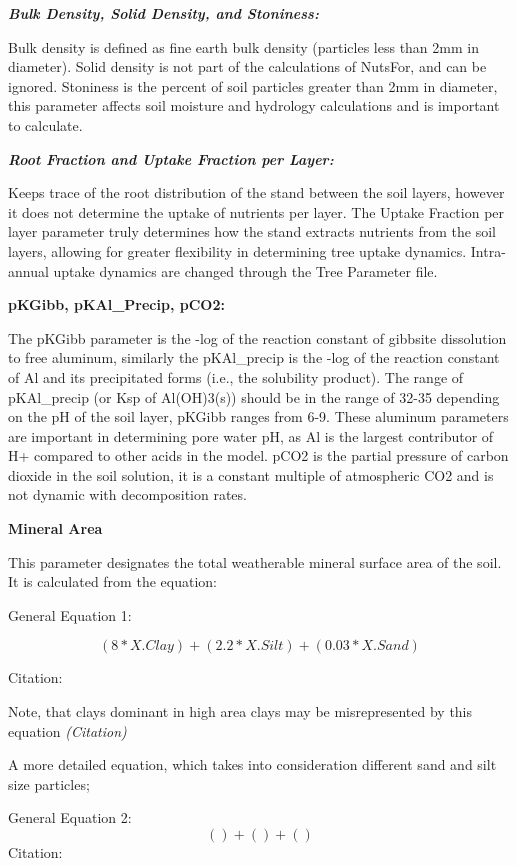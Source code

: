 \documentclass[
]{article}
\begin{document}
\textbf{\emph{Bulk Density, Solid Density, and Stoniness:}}

Bulk density is defined as fine earth bulk density (particles less than
2mm in diameter). Solid density is not part of the calculations of
NutsFor, and can be ignored. Stoniness is the percent of soil particles
greater than 2mm in diameter, this parameter affects soil moisture and
hydrology calculations and is important to calculate.

\textbf{\emph{Root Fraction and Uptake Fraction per Layer:}}

Keeps trace of the root distribution of the stand between the soil
layers, however it does not determine the uptake of nutrients per layer.
The Uptake Fraction per layer parameter truly determines how the stand
extracts nutrients from the soil layers, allowing for greater
flexibility in determining tree uptake dynamics. Intra-annual uptake
dynamics are changed through the Tree Parameter file.

\textbf{pKGibb, pKAl\_Precip, pCO2:}

The pKGibb parameter is the -log of the reaction constant of gibbsite
dissolution to free aluminum, similarly the pKAl\_precip is the -log of
the reaction constant of Al and its precipitated forms (i.e., the
solubility product). The range of pKAl\_precip (or Ksp of Al(OH)3(s))
should be in the range of 32-35 depending on the pH of the soil layer,
pKGibb ranges from 6-9. These aluminum parameters are important in
determining pore water pH, as Al is the largest contributor of H+
compared to other acids in the model. pCO2 is the partial pressure of
carbon dioxide in the soil solution, it is a constant multiple of
atmospheric CO2 and is not dynamic with decomposition rates.

\textbf{Mineral Area}

This parameter designates the total weatherable mineral surface area of
the soil. It is calculated from the equation:

General Equation 1:

\[
(8*X.Clay)+(2.2*X.Silt)+(0.03*X.Sand)
\]

Citation:

Note, that clays dominant in high area clays may be misrepresented by
this equation \emph{(Citation)}

A more detailed equation, which takes into consideration different sand
and silt size particles;

General Equation 2: \[
()+()+()
\] Citation:
\end{document}

